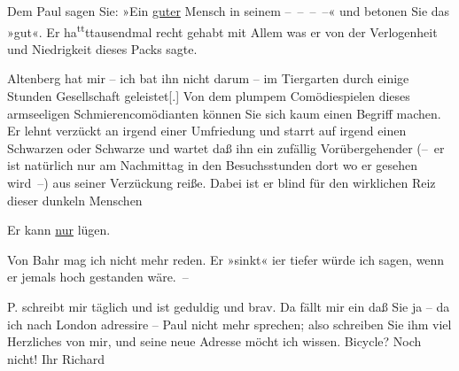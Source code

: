 \pstart
           Dem Paul sagen Sie: »Ein \uline{guter} Mensch in seinem – – – –« und betonen Sie das »gut«. Er ha\substVorne{}\textsuperscript{tt}\substDazwischen{}t\substHinten{}{ }{\pb}tausendmal recht gehabt mit Allem
               was er von der Verlogenheit und Niedrigkeit dieses Packs sagte.\pend
           
\pstart
           Altenberg hat mir – ich bat ihn nicht darum –
              {\pb}im Tiergarten durch einige Stunden Gesellschaft
                  geleistet{[}.{]} Von dem plumpem Comödiespielen dieses armseeligen
               Schmierencomödianten können Sie sich kaum einen Begriff machen. {\pb}Er lehnt verzückt an irgend einer
               Umfriedung und starrt auf irgend einen Schwarzen oder Schwarze und wartet daß ihn ein
               zufällig Vorübergehender (– er ist natürlich nur am Nachmittag in den Besuchsstunden
               dort wo er gesehen wird –) {\pb}aus
               seiner Verzückung reiße. Dabei ist er blind für den wirklichen Reiz dieser dunkeln
               Menschen\pend
           
\pstart
           Er kann \uline{nur} lügen.\pend
           
\pstart
           Von Bahr mag ich {\pb}nicht mehr reden. Er »sinkt« i{\geminationm}er tiefer würde ich sagen, wenn er jemals hoch
               gestanden wäre. –\pend
           
\pstart
           P. schreibt mir täglich und ist geduldig und
               brav. Da fällt {\pb}mir ein daß Sie ja
               – da ich nach London adressire – Paul nicht mehr sprechen; also schreiben Sie
               ihm viel Herzliches von mir, und seine neue Adresse möcht ich wissen. Bicycle? Noch
               nicht!\pend
           \pstart Ihr \spacefill\mbox{Richard}\pend{}\endnumbering{}  \newcommand{\dateiname}{L00680}\newcommand{\titel}{Richard Beer-Hofmann an Arthur Schnitzler, 22. 5. 1897}\newcommand{\editorInnen}{Herausgegeben von Martin Anton Müller}
